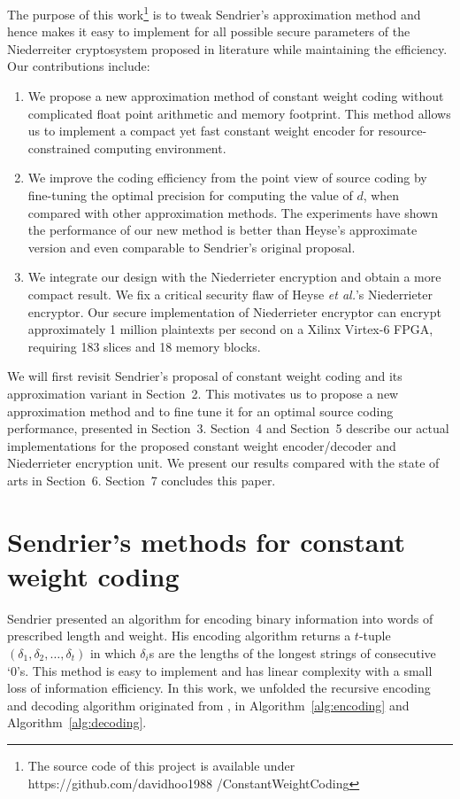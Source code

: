 \documentclass[10pt,journal,compsoc]{IEEEtran}
\begin{document}
The purpose of this work\footnote[$\ast$]{The source code of this project is
available under https://github.com/davidhoo1988
/ConstantWeightCoding} is to tweak Sendrier's approximation method \cite{sendrier2005encoding} and hence makes it easy to implement for all
possible secure parameters of the Niederreiter cryptosystem proposed in literature
while maintaining the efficiency. Our contributions include:
\begin{enumerate}
\item We propose a new approximation method of constant weight coding without complicated float point
arithmetic and memory footprint. This method allows us to implement a compact yet fast constant weight encoder
for resource-constrained computing environment.
\item We improve the coding efficiency from the point view of source coding by fine-tuning the optimal precision
for computing the value of $d$, when compared with other approximation methods. The experiments have shown the performance of our new method is better
than Heyse's approximate version\cite{heyse2010low}
and even comparable  to Sendrier's original proposal\cite{sendrier2005encoding}.
\item We integrate our design with the Niederrieter encryption and obtain a more compact result. We fix a critical security flaw of Heyse \textit{et al.}'s Niederrieter encryptor\cite{heyse2012towards}.
Our secure implementation of Niederrieter encryptor can encrypt approximately 1 million plaintexts per second
on a Xilinx Virtex-6 FPGA, requiring 183 slices and 18 memory blocks.
\end{enumerate}

We will first revisit Sendrier's proposal of constant weight coding and its approximation variant\cite{sendrier2005encoding,heyse2010low} in Section~2. This
motivates us to propose a new approximation method and to fine tune it for an optimal source coding performance, presented in Section~3.
Section~4 and Section~5 describe our actual implementations for the proposed constant weight encoder/decoder and Niederrieter
encryption unit. We present our results compared with the state of arts in Section~6. Section~7 concludes this paper.



\section{Sendrier's methods for constant weight coding}
Sendrier presented an algorithm for encoding binary information into words of prescribed length and weight\cite{sendrier2005encoding}.
His encoding algorithm returns a $t$-tuple $(\delta_1,\delta_2,\ldots,\delta_t)$ in which $\delta_i$s are the lengths of the longest strings of consecutive `0's.
This method is easy to implement and has linear complexity with a small loss of information efficiency.
In this work, we unfolded the recursive encoding and decoding algorithm originated from \cite{sendrier2005encoding}, in Algorithm~\ref{alg:encoding} and Algorithm~\ref{alg:decoding}.
\end{document}

